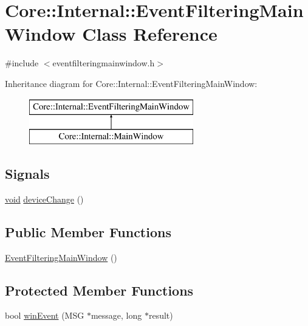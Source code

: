 \hypertarget{class_core_1_1_internal_1_1_event_filtering_main_window}{\section{\-Core\-:\-:\-Internal\-:\-:\-Event\-Filtering\-Main\-Window \-Class \-Reference}
\label{class_core_1_1_internal_1_1_event_filtering_main_window}
}


{\ttfamily \#include $<$eventfilteringmainwindow.\-h$>$}

\-Inheritance diagram for \-Core\-:\-:\-Internal\-:\-:\-Event\-Filtering\-Main\-Window\-:\begin{figure}[H]
\begin{center}
\leavevmode
\includegraphics[height=2.000000cm]{class_core_1_1_internal_1_1_event_filtering_main_window}
\end{center}
\end{figure}
\subsection*{\-Signals}
\begin{DoxyCompactItemize}
\item 
\hyperlink{group___u_a_v_objects_plugin_ga444cf2ff3f0ecbe028adce838d373f5c}{void} \hyperlink{group___core_plugin_gac3fc413fc8a7712489a7f06887f72474}{device\-Change} ()
\end{DoxyCompactItemize}
\subsection*{\-Public \-Member \-Functions}
\begin{DoxyCompactItemize}
\item 
\hyperlink{group___core_plugin_gae292d853eb38e063bbf621e7895b45c9}{\-Event\-Filtering\-Main\-Window} ()
\end{DoxyCompactItemize}
\subsection*{\-Protected \-Member \-Functions}
\begin{DoxyCompactItemize}
\item 
bool \hyperlink{group___core_plugin_ga67c2e3c1e5955cc0ae7f4225ec54b57f}{win\-Event} (\-M\-S\-G $\ast$message, long $\ast$result)
\end{DoxyCompactItemize}


